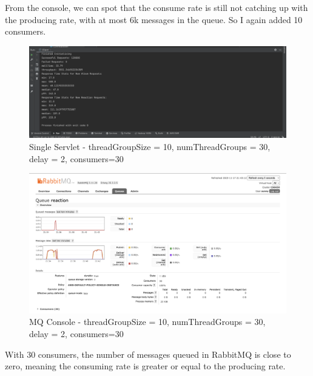 \documentclass[a4paper,12pt]{article} %
\begin{document}
\begin{enumerate}
From the console, we can spot that the consume rate is still not catching up with the producing rate, with at most 6k messages in the queue.
So I again added 10 consumers.
\begin{figure}[H]
    \centering
    \includegraphics[width=\textwidth]{images/stats_30consumer.png}
    \caption{Single Servlet - threadGroupSize = 10, numThreadGroups = 30, delay = 2, consumers=30}
\end{figure}
\begin{figure}[H]
    \centering
    \includegraphics[width=\textwidth]{images/mq_console_30consumer.png}
    \caption{MQ Console - threadGroupSize = 10, numThreadGroups = 30, delay = 2, consumers=30}
\end{figure}

With 30 consumers, the number of messages queued in RabbitMQ is close to zero, meaning the consuming rate is greater or equal to the producing rate.
\clearpage


\end{enumerate}
\end{document}
